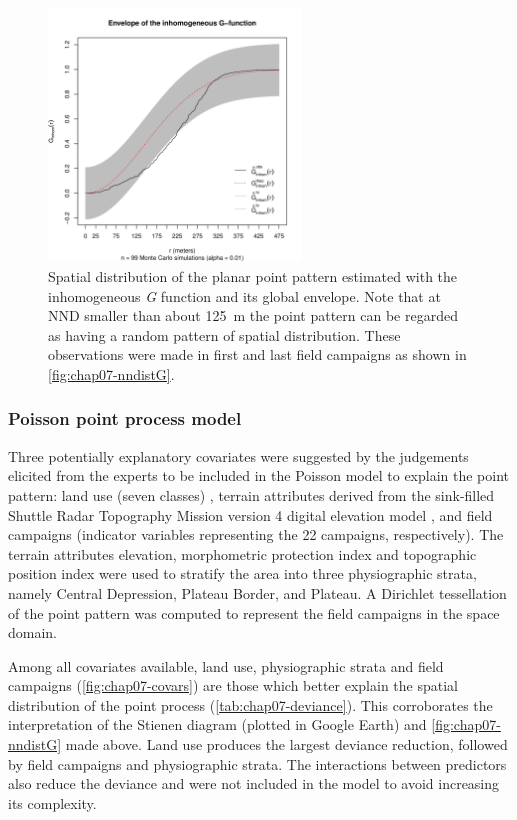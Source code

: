 \begin{figure}[!ht]
\centering
\includegraphics[trim=0mm 0mm 0mm 38mm, clip=true, width=0.6\textwidth]{fig/chap07-gest-sim}
\caption[Estimated inhomogeneous \emph{G} function and its global envelope.]{Spatial distribution of the planar 
point pattern estimated with the inhomogeneous \emph{G} function and its global envelope. Note that at NND 
smaller than about \SI{125}{\m} the point pattern can be regarded as having a random pattern of spatial 
distribution. These observations were made in first and last field campaigns as shown in 
\autoref{fig:chap07-nndistG}.}
\label{fig:chap07-gest}
\end{figure}

\subsubsection{Poisson point process model}

Three potentially explanatory covariates were suggested by the judgements elicited from the experts to be 
included in the Poisson model to explain the point pattern: land use (seven classes) 
\cite{SamuelRosaEtAl2011a}, terrain attributes derived from the sink-filled Shuttle Radar Topography Mission 
version \num{4} digital elevation model \cite{ReuterEtAl2007}, and field campaigns (indicator variables 
representing the 22 campaigns, respectively). The terrain attributes elevation, morphometric protection index 
and topographic position index were used to stratify the area into three physiographic strata, namely Central 
Depression, Plateau Border, and Plateau. A Dirichlet tessellation of the point pattern was computed to 
represent the field campaigns 
in the space domain.

Among all covariates available, land use, physiographic strata and field campaigns 
(\autoref{fig:chap07-covars}) are those which better explain the spatial distribution of the point process 
(\autoref{tab:chap07-deviance}). This corroborates the interpretation of the Stienen diagram (plotted in 
Google Earth\rr{}) and \autoref{fig:chap07-nndistG} made above. Land use produces the largest deviance 
reduction, followed by field campaigns and physiographic strata. The interactions between predictors also 
reduce the deviance and were not included in the model to avoid increasing its complexity.


